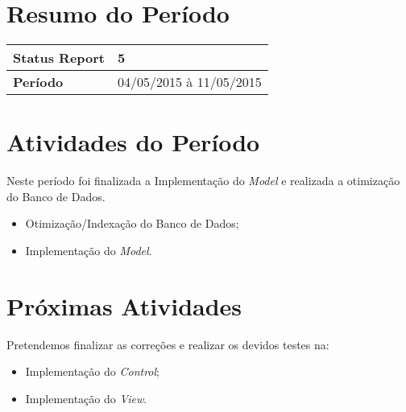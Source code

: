 \documentclass[a4paper,12pt]{article}
\begin{document}

\newpage

\section{Resumo do Período}

\begin{longtable}{|l|l|}
\hline
\textbf{Status Report} & 5\\
\hline
\textbf{Período}	&	04/05/2015 à 11/05/2015 \\
\hline
\end{longtable}


\section{Atividades do Período}

Neste período foi finalizada a Implementação do \textit{Model} e realizada a otimização do Banco de Dados.

\begin{itemize}

\item{Otimização/Indexação do Banco de Dados;}

\item{Implementação do \textit{Model}.}


\end{itemize}



\section{Próximas Atividades}

Pretendemos finalizar as correções e realizar os devidos testes na:

\begin{itemize}

\item{Implementação do \textit{Control};}

\item{Implementação do \textit{View}.}

\end{itemize}
\end{document}
